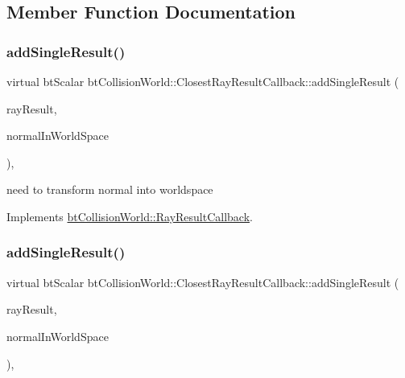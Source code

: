 \subsection{Member Function Documentation}
\mbox{\label{structbtCollisionWorld_1_1ClosestRayResultCallback_a36afc6c41a6f7576a9b6d23771cf8fc4}} 
\subsubsection{\texorpdfstring{add\+Single\+Result()}{addSingleResult()}\hspace{0.1cm}{\footnotesize\ttfamily [1/2]}}
{\footnotesize\ttfamily virtual bt\+Scalar bt\+Collision\+World\+::\+Closest\+Ray\+Result\+Callback\+::add\+Single\+Result (\begin{DoxyParamCaption}\item[{\hyperlink{structbtCollisionWorld_1_1LocalRayResult}{Local\+Ray\+Result} \&}]{ray\+Result,  }\item[{bool}]{normal\+In\+World\+Space }\end{DoxyParamCaption})\hspace{0.3cm}{\ttfamily [inline]}, {\ttfamily [virtual]}}

need to transform normal into worldspace 

Implements \hyperlink{structbtCollisionWorld_1_1RayResultCallback}{bt\+Collision\+World\+::\+Ray\+Result\+Callback}.

\mbox{\label{structbtCollisionWorld_1_1ClosestRayResultCallback_a36afc6c41a6f7576a9b6d23771cf8fc4}} 
\subsubsection{\texorpdfstring{add\+Single\+Result()}{addSingleResult()}\hspace{0.1cm}{\footnotesize\ttfamily [2/2]}}
{\footnotesize\ttfamily virtual bt\+Scalar bt\+Collision\+World\+::\+Closest\+Ray\+Result\+Callback\+::add\+Single\+Result (\begin{DoxyParamCaption}\item[{\hyperlink{structbtCollisionWorld_1_1LocalRayResult}{Local\+Ray\+Result} \&}]{ray\+Result,  }\item[{bool}]{normal\+In\+World\+Space }\end{DoxyParamCaption})\hspace{0.3cm}{\ttfamily [inline]}, {\ttfamily [virtual]}}

